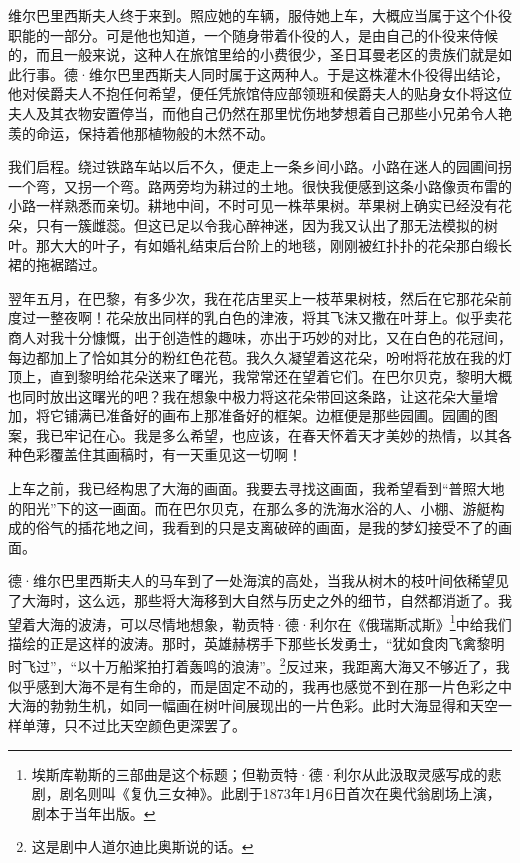 \par 维尔巴里西斯夫人终于来到。照应她的车辆，服侍她上车，大概应当属于这个仆役职能的一部分。可是他也知道，一个随身带着仆役的人，是由自己的仆役来侍候的，而且一般来说，这种人在旅馆里给的小费很少，圣日耳曼老区的贵族们就是如此行事。德·维尔巴里西斯夫人同时属于这两种人。于是这株灌木仆役得出结论，他对侯爵夫人不抱任何希望，便任凭旅馆侍应部领班和侯爵夫人的贴身女仆将这位夫人及其衣物安置停当，而他自己仍然在那里忧伤地梦想着自己那些小兄弟令人艳羡的命运，保持着他那植物般的木然不动。
\par 我们启程。绕过铁路车站以后不久，便走上一条乡间小路。小路在迷人的园圃间拐一个弯，又拐一个弯。路两旁均为耕过的土地。很快我便感到这条小路像贡布雷的小路一样熟悉而亲切。耕地中间，不时可见一株苹果树。苹果树上确实已经没有花朵，只有一簇雌蕊。但这已足以令我心醉神迷，因为我又认出了那无法模拟的树叶。那大大的叶子，有如婚礼结束后台阶上的地毯，刚刚被红扑扑的花朵那白缎长裙的拖裾踏过。
\par 翌年五月，在巴黎，有多少次，我在花店里买上一枝苹果树枝，然后在它那花朵前度过一整夜啊！花朵放出同样的乳白色的津液，将其飞沫又撒在叶芽上。似乎卖花商人对我十分慷慨，出于创造性的趣味，亦出于巧妙的对比，又在白色的花冠间，每边都加上了恰如其分的粉红色花苞。我久久凝望着这花朵，吩咐将花放在我的灯顶上，直到黎明给花朵送来了曙光，我常常还在望着它们。在巴尔贝克，黎明大概也同时放出这曙光的吧？我在想象中极力将这花朵带回这条路，让这花朵大量增加，将它铺满已准备好的画布上那准备好的框架。边框便是那些园圃。园圃的图案，我已牢记在心。我是多么希望，也应该，在春天怀着天才美妙的热情，以其各种色彩覆盖住其画稿时，有一天重见这一切啊！
\par 上车之前，我已经构思了大海的画面。我要去寻找这画面，我希望看到“普照大地的阳光”下的这一画面。而在巴尔贝克，在那么多的洗海水浴的人、小棚、游艇构成的俗气的插花地之间，我看到的只是支离破碎的画面，是我的梦幻接受不了的画面。
\par 德·维尔巴里西斯夫人的马车到了一处海滨的高处，当我从树木的枝叶间依稀望见了大海时，这么远，那些将大海移到大自然与历史之外的细节，自然都消逝了。我望着大海的波涛，可以尽情地想象，勒贡特·德·利尔在《俄瑞斯忒斯》\footnote{埃斯库勒斯的三部曲是这个标题；但勒贡特·德·利尔从此汲取灵感写成的悲剧，剧名则叫《复仇三女神》。此剧于1873年1月6日首次在奥代翁剧场上演，剧本于当年出版。}中给我们描绘的正是这样的波涛。那时，英雄赫楞手下那些长发勇士，“犹如食肉飞禽黎明时飞过”，“以十万船桨拍打着轰鸣的浪涛”。\footnote{这是剧中人道尔迪比奥斯说的话。}反过来，我距离大海又不够近了，我似乎感到大海不是有生命的，而是固定不动的，我再也感觉不到在那一片色彩之中大海的勃勃生机，如同一幅画在树叶间展现出的一片色彩。此时大海显得和天空一样单薄，只不过比天空颜色更深罢了。
